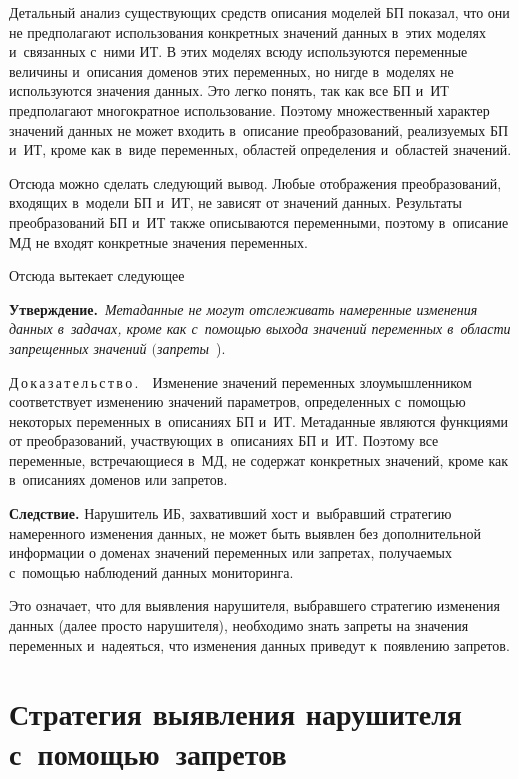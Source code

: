 \begin{multicols}{2}
  Детальный анализ существующих средств описания моделей БП показал, что 
они не предполагают использования конкретных значений данных в~этих моделях 
и~связанных с~ними ИТ. В этих моделях всюду используются переменные 
величины и~описания доменов этих переменных, но нигде в~моделях не 
используются значения данных. Это легко понять, так как все БП и~ИТ 
предполагают многократное использование. Поэтому множественный характер 
значений данных не может входить в~описание преобразований, реализуемых БП 
и~ИТ, кроме как в~виде переменных, областей определения и~областей значений. 
  
  Отсюда можно сделать следующий вывод. Любые отображения 
преобразований, входящих в~модели БП и~ИТ, не зависят от значений данных. 
Результаты преобразований БП и~ИТ также описываются переменными, поэтому 
в~описание МД не входят конкретные значения переменных. 
  
  Отсюда вытекает следующее
  
  \smallskip
  
  \noindent
  \textbf{Утверждение.}\ \textit{Метаданные не могут отслеживать 
намеренные изменения данных в~задачах, кроме как с~помощью выхода значений 
переменных в~области запрещенных значений $($запреты}~\cite{6-gr}). 
  
  \smallskip
  
  \noindent
  Д\,о\,к\,а\,з\,а\,т\,е\,л\,ь\,с\,т\,в\,о\,.\ \ Изменение значений переменных 
злоумышленником соответствует изменению значений параметров, определенных 
с~по\-мощью некоторых переменных в~описаниях БП и~ИТ. Метаданные являются 
функциями от преобразований, участвующих в~описаниях БП и~ИТ. Поэтому все 
переменные, встречающиеся в~МД, не содержат конкретных значений, кроме как 
в~описаниях доменов или запретов. 
  
  \smallskip
  
  \noindent
  \textbf{Следствие.} Нарушитель ИБ, захвативший хост и~выбравший стратегию 
намеренного изменения данных, не может быть выявлен без дополнительной 
информации о доменах значений переменных или запретах, получаемых 
с~помощью наблюдений данных мониторинга. 
  
  Это означает, что для выявления нарушителя, выбравшего стратегию изменения 
данных (далее просто нарушителя), необходимо знать запреты на значения 
переменных и~надеяться, что изменения данных приведут к~появлению запретов. 
  

\section{Стратегия выявления нарушителя с~помощью~запретов}


\end{multicols}
